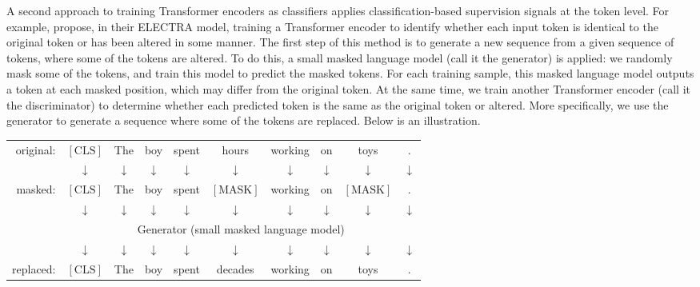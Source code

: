 A second approach to training Transformer encoders as classifiers applies classification-based supervision signals at the token level. For example, \citet{clark-etal:2019electra} propose, in their ELECTRA model, training a Transformer encoder to identify whether each input token is identical to the original token or has been altered in some manner. The first step of this method is to generate a new sequence from a given sequence of tokens, where some of the tokens are altered. To do this, a small masked language model (call it the generator) is applied: we randomly mask some of the tokens, and train this model to predict the masked tokens. For each training sample, this masked language model outputs a token at each masked position, which may differ from the original token. At the same time, we train another Transformer encoder (call it the discriminator) to determine whether each predicted token is the same as the original token or altered. More specifically, we use the generator to generate a sequence where some of the tokens are replaced. Below is an illustration.

\vspace{0.5em}
\begin{center}
\begingroup
\renewcommand{\arraystretch}{1.2}
\begin{tabular}{r c c c c c c c c c}
original: & $[\mathrm{CLS}]$ & The & boy & spent & hours & working & on & toys & . \\
& $\downarrow$ & $\downarrow$ & $\downarrow$ & $\downarrow$ & $\downarrow$ & $\downarrow$ & $\downarrow$ & $\downarrow$ & $\downarrow$ \\
masked: & $[\mathrm{CLS}]$ & The & boy & spent & {\color{red} $[\mathrm{MASK}]$} & working & on & {\color{red} $[\mathrm{MASK}]$} & . \\
& $\downarrow$ & $\downarrow$ & $\downarrow$ & $\downarrow$ & {\color{red} $\downarrow$} & $\downarrow$ & $\downarrow$ & {\color{red} $\downarrow$} & $\downarrow$ \\ \cline{2-10}
& \multicolumn{9}{|c|}{Generator (small masked language model)} \\ \cline{2-10}
& $\downarrow$ & $\downarrow$ & $\downarrow$ & $\downarrow$ & {\color{red} $\downarrow$} & $\downarrow$ & $\downarrow$ & {\color{red} $\downarrow$} & $\downarrow$ \\
replaced: & $[\mathrm{CLS}]$ & The & boy & spent & {\color{red} decades} & working & on & {\color{red} toys} & .
\end{tabular}
\endgroup
\end{center}
\vspace{0.5em}

